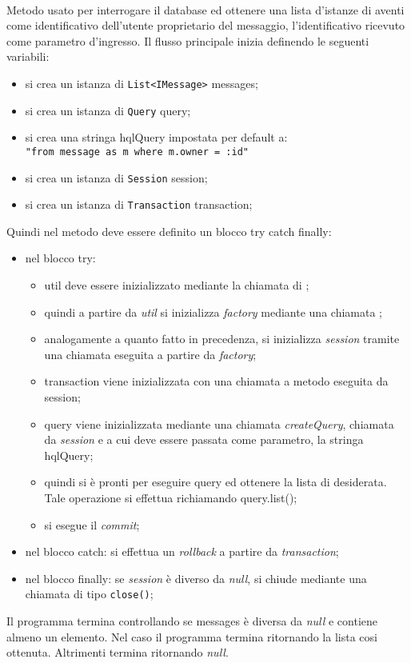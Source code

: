 \begin{description}
	\item{}\\
	Metodo usato per interrogare il database ed ottenere una lista d'istanze di  aventi come identificativo dell'utente proprietario del messaggio, l'identificativo ricevuto come parametro d'ingresso. Il flusso principale inizia definendo le seguenti variabili:
	\begin{itemize}
		\item si crea un istanza di \texttt{List<IMessage>} messages;
		\item si crea un istanza di \texttt{Query} query;
		\item si crea una stringa hqlQuery impostata per default a:\\
			\verb|"from message as m where m.owner = :id"|
		\item si crea un istanza di \texttt{Session} session;
		\item si crea un istanza di \texttt{Transaction} transaction;
	\end{itemize}
	Quindi nel metodo deve essere definito un blocco try catch finally:
	\begin{itemize}
		\item nel blocco try:
		\begin{itemize}
			\item util deve essere inizializzato mediante la chiamata  di ;
			\item quindi a partire da \textit{util} si inizializza \textit{factory} mediante una chiamata ;
			\item analogamente a quanto fatto in precedenza, si inizializza \textit{session} tramite una chiamata  eseguita a partire da \textit{factory};
			\item transaction viene inizializzata con una chiamata a metodo  eseguita da session;
			\item query viene inizializzata mediante una chiamata \textit{createQuery}, chiamata da \textit{session} e a cui deve essere passata come parametro, la stringa hqlQuery;
			\item quindi si è pronti per eseguire query ed ottenere la lista di  desiderata. Tale operazione si effettua richiamando query.list();
			\item si esegue il \textit{commit};
		\end{itemize}
		\item nel blocco catch: si effettua un \textit{rollback} a partire da \textit{transaction};
		\item nel blocco finally: se \textit{session} è diverso da \textit{null}, si chiude mediante una chiamata di tipo \texttt{close()};
	\end{itemize}
	Il programma termina controllando se messages è diversa da \textit{null} e contiene almeno un elemento. Nel caso il programma termina ritornando la lista cosi ottenuta. Altrimenti termina ritornando \textit{null}.
	
\end{description}

